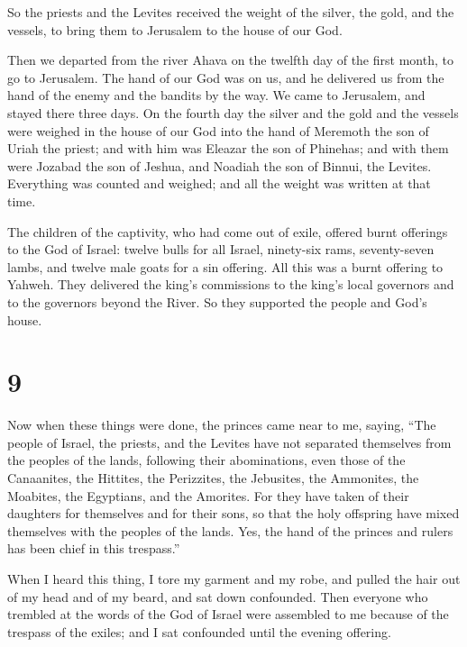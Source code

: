  So the priests and the Levites received the weight of the
silver, the gold, and the vessels, to bring them to Jerusalem to the
house of our God.

 Then we departed from the river Ahava on the twelfth day
of the first month, to go to Jerusalem. The hand of our God was on us,
and he delivered us from the hand of the enemy and the bandits by the
way.  We came to Jerusalem, and stayed there three days.
 On the fourth day the silver and the gold and the vessels
were weighed in the house of our God into the hand of Meremoth the son
of Uriah the priest; and with him was Eleazar the son of Phinehas; and
with them were Jozabad the son of Jeshua, and Noadiah the son of Binnui,
the Levites.  Everything was counted and weighed; and all
the weight was written at that time.

 The children of the captivity, who had come out of exile,
offered burnt offerings to the God of Israel: twelve bulls for all
Israel, ninety-six rams, seventy-seven lambs, and twelve male goats for
a sin offering. All this was a burnt offering to Yahweh. 
They delivered the king's commissions to the king's local governors and
to the governors beyond the River. So they supported the people and
God's house.

\hypertarget{section-8}{%
\section{9}\label{section-8}}

 Now when these things were done, the princes came near to
me, saying, ``The people of Israel, the priests, and the Levites have
not separated themselves from the peoples of the lands, following their
abominations, even those of the Canaanites, the Hittites, the
Perizzites, the Jebusites, the Ammonites, the Moabites, the Egyptians,
and the Amorites.  For they have taken of their daughters
for themselves and for their sons, so that the holy offspring have mixed
themselves with the peoples of the lands. Yes, the hand of the princes
and rulers has been chief in this trespass.''

 When I heard this thing, I tore my garment and my robe, and
pulled the hair out of my head and of my beard, and sat down confounded.
 Then everyone who trembled at the words of the God of
Israel were assembled to me because of the trespass of the exiles; and I
sat confounded until the evening offering.

